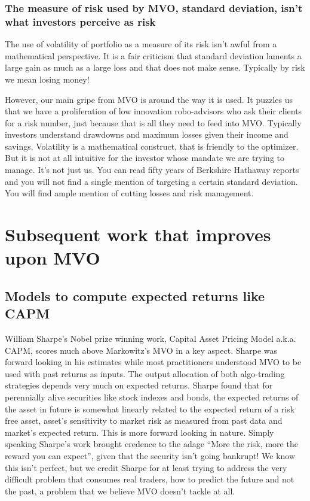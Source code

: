 \documentclass[a4paper]{article}
\begin{document}
\subsubsection{The measure of risk used by MVO, standard deviation, isn’t what investors perceive as risk}
The use of volatility of portfolio as a measure of its risk isn’t awful from a mathematical perspective. It is a fair criticism that standard deviation laments a large gain as much as a large loss and that does not make sense. Typically by risk we mean losing money!


However, our main gripe from MVO is around the way it is used. It puzzles us that we have a proliferation of low innovation robo-advisors who ask their clients for a risk number, just because that is all they need to feed into MVO. Typically investors understand drawdowns and maximum losses given their income and savings. Volatility is a mathematical construct, that is friendly to the optimizer. But it is not at all intuitive for the investor whose mandate we are trying to manage. It’s not just us. You can read fifty years of Berkshire Hathaway reports and you will not find a single mention of targeting a certain standard deviation. You will find ample mention of cutting losses and risk management.

\section{Subsequent work that improves upon MVO\label{subsequent-work}}
\subsection{Models to compute expected returns like CAPM}
William Sharpe’s Nobel prize winning work\cite{Shp90}, Capital Asset Pricing Model a.k.a. CAPM, scores much above Markowitz’s MVO in a key aspect. Sharpe was forward looking in his estimates while most practitioners understood MVO to be used with past returns as inputs. The output allocation of both algo-trading strategies depends very much on expected returns. Sharpe found that for perennially alive securities like stock indexes and bonds, the expected returns of the asset in future is somewhat linearly related to the expected return of a risk free asset, asset’s sensitivity to market risk as measured from past data and market’s expected return. This is more forward looking in nature. Simply speaking Sharpe’s work brought credence to the adage “More the risk, more the reward you can expect”, given that the security isn’t going bankrupt! We know this isn’t perfect, but we credit Sharpe for at least trying to address the very difficult problem that consumes real traders, how to predict the future and not the past, a problem that we believe MVO doesn’t tackle at all.
\end{document}
